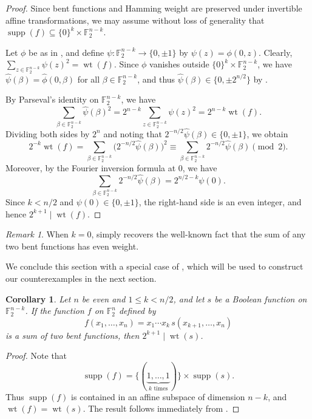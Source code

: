\documentclass{amsart}
\numberwithin{equation}{section}
\theoremstyle{plain}
\newtheorem{corollary}[equation]{Corollary}
\theoremstyle{definition}
\theoremstyle{remark}
\newtheorem{remark}[equation]{Remark}
\DeclareMathOperator{\wt}{wt}
\DeclareMathOperator{\supp}{supp}
\newcommand{\F}{\mathbb{F}_2}
\begin{document}
\begin{proof}
Since bent functions and Hamming weight are preserved under invertible affine transformations, we may assume without loss of generality that $\supp(f) \subseteq \{0\}^k \times \F^{n-k}$.

Let $\phi$ be as in , and define $\psi\colon \F^{n-k} \to \{0, \pm 1\}$ by $\psi(z) = \phi(0, z)$. Clearly, $\sum_{z \in \F^{n-k}} \psi(z)^2 = \wt(f)$. Since $\phi$ vanishes outside $\{0\}^k \times \F^{n-k}$, we have $\widehat{\psi}(\beta) = \widehat{\phi}(0, \beta)$ for all $\beta \in \F^{n-k}$, and thus $\widehat{\psi}(\beta) \in \{0, \pm 2^{n/2}\}$ by .

By Parseval's identity on $\F^{n-k}$, we have
\[
  \sum_{\beta \in \F^{n-k}} \widehat{\psi}(\beta)^2 = 2^{n-k} \sum_{z \in \F^{n-k}} \psi(z)^2 = 2^{n-k}\wt(f).
\]
Dividing both sides by $2^n$ and noting that $2^{-n/2}\widehat{\psi}(\beta) \in \{0, \pm 1\}$, we obtain
\[
  2^{-k}\wt(f) = \sum_{\beta \in \F^{n-k}} \bigl(2^{-n/2}\widehat{\psi}(\beta)\bigr)^2
  \equiv \sum_{\beta \in \F^{n-k}} 2^{-n/2}\widehat{\psi}(\beta) \pmod 2.
\]
Moreover, by the Fourier inversion formula at $0$, we have
\[
  \sum_{\beta \in \F^{n-k}} 2^{-n/2}\widehat{\psi}(\beta) = 2^{n/2-k}\psi(0).
\]
Since $k < n/2$ and $\psi(0) \in \{0, \pm 1\}$, the right-hand side is an even integer, and hence $2^{k+1} \mid \wt(f)$.
\end{proof}

\begin{remark}
When $k=0$,  simply recovers the well-known fact that the sum of any two bent functions has even weight.
\end{remark}

We conclude this section with a special case of , which will be used to construct our counterexamples in the next section.

\begin{corollary}
\label{cor:cylinder}
Let $n$ be even and $1 \le k < n/2$, and let $s$ be a Boolean function on $\F^{n-k}$. If the function $f$ on $\F^n$ defined by
\[
  f(x_1,\ldots,x_n) = x_1\cdots x_k\,s(x_{k+1},\ldots,x_n)
\]
is a sum of two bent functions, then $2^{k+1} \mid \wt(s)$.
\end{corollary}

\begin{proof}
Note that
\[
    \supp(f)
    = \bigl\{(\underbrace{1,\ldots,1}_{k\text{ times}})\bigr\}
      \times \supp(s).
\]
Thus $\supp(f)$ is contained in an affine subspace of dimension
$n-k$, and $\wt(f)=\wt(s)$. The result follows immediately from
.
\end{proof}
\end{document}
